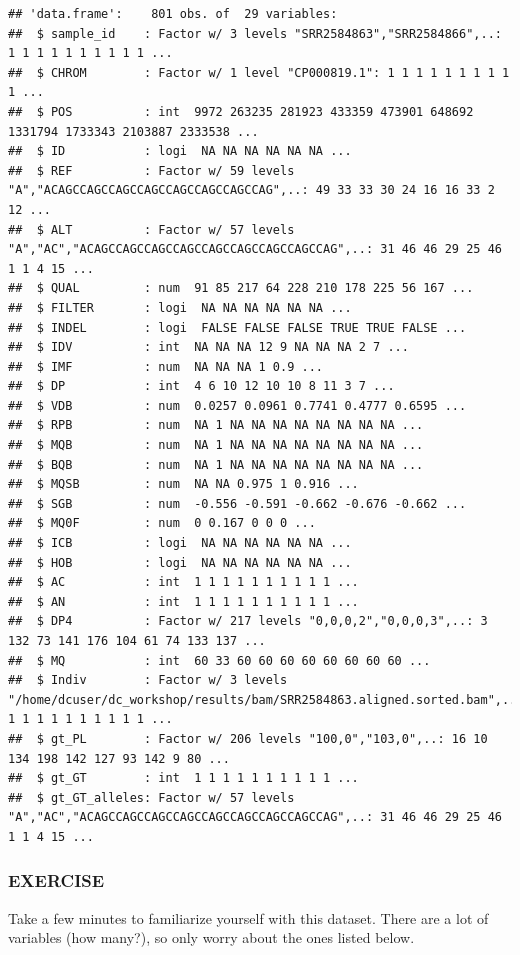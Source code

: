 \documentclass[
]{book}
\begin{document}
\begin{verbatim}
## 'data.frame':    801 obs. of  29 variables:
##  $ sample_id    : Factor w/ 3 levels "SRR2584863","SRR2584866",..: 1 1 1 1 1 1 1 1 1 1 ...
##  $ CHROM        : Factor w/ 1 level "CP000819.1": 1 1 1 1 1 1 1 1 1 1 ...
##  $ POS          : int  9972 263235 281923 433359 473901 648692 1331794 1733343 2103887 2333538 ...
##  $ ID           : logi  NA NA NA NA NA NA ...
##  $ REF          : Factor w/ 59 levels "A","ACAGCCAGCCAGCCAGCCAGCCAGCCAGCCAG",..: 49 33 33 30 24 16 16 33 2 12 ...
##  $ ALT          : Factor w/ 57 levels "A","AC","ACAGCCAGCCAGCCAGCCAGCCAGCCAGCCAGCCAG",..: 31 46 46 29 25 46 1 1 4 15 ...
##  $ QUAL         : num  91 85 217 64 228 210 178 225 56 167 ...
##  $ FILTER       : logi  NA NA NA NA NA NA ...
##  $ INDEL        : logi  FALSE FALSE FALSE TRUE TRUE FALSE ...
##  $ IDV          : int  NA NA NA 12 9 NA NA NA 2 7 ...
##  $ IMF          : num  NA NA NA 1 0.9 ...
##  $ DP           : int  4 6 10 12 10 10 8 11 3 7 ...
##  $ VDB          : num  0.0257 0.0961 0.7741 0.4777 0.6595 ...
##  $ RPB          : num  NA 1 NA NA NA NA NA NA NA NA ...
##  $ MQB          : num  NA 1 NA NA NA NA NA NA NA NA ...
##  $ BQB          : num  NA 1 NA NA NA NA NA NA NA NA ...
##  $ MQSB         : num  NA NA 0.975 1 0.916 ...
##  $ SGB          : num  -0.556 -0.591 -0.662 -0.676 -0.662 ...
##  $ MQ0F         : num  0 0.167 0 0 0 ...
##  $ ICB          : logi  NA NA NA NA NA NA ...
##  $ HOB          : logi  NA NA NA NA NA NA ...
##  $ AC           : int  1 1 1 1 1 1 1 1 1 1 ...
##  $ AN           : int  1 1 1 1 1 1 1 1 1 1 ...
##  $ DP4          : Factor w/ 217 levels "0,0,0,2","0,0,0,3",..: 3 132 73 141 176 104 61 74 133 137 ...
##  $ MQ           : int  60 33 60 60 60 60 60 60 60 60 ...
##  $ Indiv        : Factor w/ 3 levels "/home/dcuser/dc_workshop/results/bam/SRR2584863.aligned.sorted.bam",..: 1 1 1 1 1 1 1 1 1 1 ...
##  $ gt_PL        : Factor w/ 206 levels "100,0","103,0",..: 16 10 134 198 142 127 93 142 9 80 ...
##  $ gt_GT        : int  1 1 1 1 1 1 1 1 1 1 ...
##  $ gt_GT_alleles: Factor w/ 57 levels "A","AC","ACAGCCAGCCAGCCAGCCAGCCAGCCAGCCAGCCAG",..: 31 46 46 29 25 46 1 1 4 15 ...
\end{verbatim}

\hypertarget{exercise-1}{%
\subsubsection*{EXERCISE}\label{exercise-1}}

Take a few minutes to familiarize yourself with this dataset. There are a lot of variables (how many?), so only worry about the ones listed below.
\end{document}
